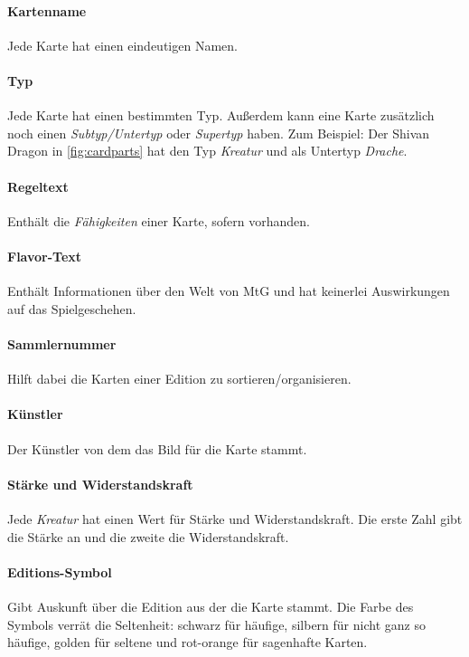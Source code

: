 \paragraph{Kartenname} 
Jede Karte hat einen eindeutigen Namen.

\paragraph{Typ}
Jede Karte hat einen bestimmten Typ. Außerdem kann eine Karte zusätzlich noch einen \emph{Subtyp/Untertyp} oder \emph{Supertyp} haben. Zum Beispiel: Der Shivan Dragon in \autoref{fig:cardparts} hat den Typ \emph{Kreatur} und als Untertyp \emph{Drache}. \cite{rulebook:2013}

\paragraph{Regeltext}
Enthält die \emph{Fähigkeiten} einer Karte, sofern vorhanden.

\paragraph{Flavor-Text}
Enthält Informationen über den Welt von \ac{MtG} und hat keinerlei Auswirkungen auf das Spielgeschehen.

\paragraph{Sammlernummer}
Hilft dabei die Karten einer Edition zu sortieren/organisieren.

\paragraph{Künstler}
Der Künstler von dem das Bild für die Karte stammt.

\paragraph{Stärke und Widerstandskraft}
Jede \emph{Kreatur} hat einen Wert für Stärke und Widerstandskraft. Die erste Zahl gibt die Stärke an und die zweite die Widerstandskraft.

\paragraph{Editions-Symbol}
Gibt Auskunft über die Edition aus der die Karte stammt. Die Farbe des Symbols verrät die Seltenheit: schwarz für häufige, silbern für nicht ganz so häufige, golden für seltene und rot-orange für sagenhafte Karten. \cite{rulebook:2013}

